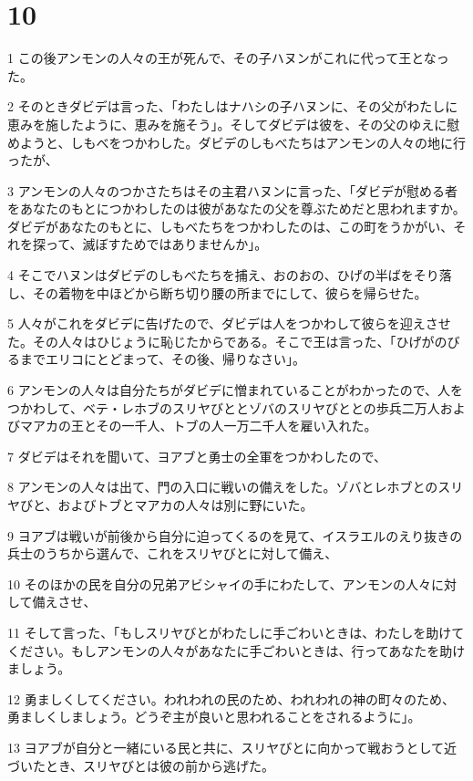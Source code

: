 \chapter{10}

\par 1 この後アンモンの人々の王が死んで、その子ハヌンがこれに代って王となった。
\par 2 そのときダビデは言った、「わたしはナハシの子ハヌンに、その父がわたしに恵みを施したように、恵みを施そう」。そしてダビデは彼を、その父のゆえに慰めようと、しもべをつかわした。ダビデのしもべたちはアンモンの人々の地に行ったが、
\par 3 アンモンの人々のつかさたちはその主君ハヌンに言った、「ダビデが慰める者をあなたのもとにつかわしたのは彼があなたの父を尊ぶためだと思われますか。ダビデがあなたのもとに、しもべたちをつかわしたのは、この町をうかがい、それを探って、滅ぼすためではありませんか」。
\par 4 そこでハヌンはダビデのしもべたちを捕え、おのおの、ひげの半ばをそり落し、その着物を中ほどから断ち切り腰の所までにして、彼らを帰らせた。
\par 5 人々がこれをダビデに告げたので、ダビデは人をつかわして彼らを迎えさせた。その人々はひじょうに恥じたからである。そこで王は言った、「ひげがのびるまでエリコにとどまって、その後、帰りなさい」。
\par 6 アンモンの人々は自分たちがダビデに憎まれていることがわかったので、人をつかわして、ベテ・レホブのスリヤびととゾバのスリヤびととの歩兵二万人およびマアカの王とその一千人、トブの人一万二千人を雇い入れた。
\par 7 ダビデはそれを聞いて、ヨアブと勇士の全軍をつかわしたので、
\par 8 アンモンの人々は出て、門の入口に戦いの備えをした。ゾバとレホブとのスリヤびと、およびトブとマアカの人々は別に野にいた。
\par 9 ヨアブは戦いが前後から自分に迫ってくるのを見て、イスラエルのえり抜きの兵士のうちから選んで、これをスリヤびとに対して備え、
\par 10 そのほかの民を自分の兄弟アビシャイの手にわたして、アンモンの人々に対して備えさせ、
\par 11 そして言った、「もしスリヤびとがわたしに手ごわいときは、わたしを助けてください。もしアンモンの人々があなたに手ごわいときは、行ってあなたを助けましょう。
\par 12 勇ましくしてください。われわれの民のため、われわれの神の町々のため、勇ましくしましょう。どうぞ主が良いと思われることをされるように」。
\par 13 ヨアブが自分と一緒にいる民と共に、スリヤびとに向かって戦おうとして近づいたとき、スリヤびとは彼の前から逃げた。
